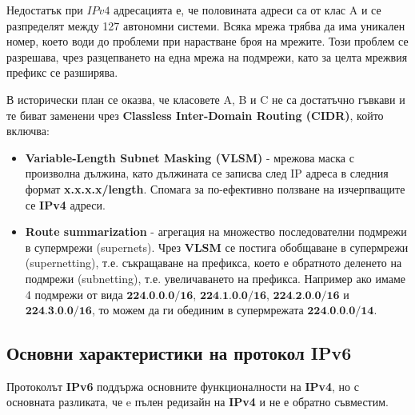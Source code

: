 \documentclass[fleqn,12pt]{article}
\begin{document}
\begin{flushleft}
Недостатък при $IPv4$ адресацията е, че половината адреси са от клас A и се разпределят между 127 автономни системи.
Всяка мрежа трябва да има уникален номер, което води до проблеми при нарастване броя на мрежите.
Този проблем се разрешава, чрез разцепването на една мрежа на подмрежи, като за целта мрежвия префикс се разширява.

В исторически план се оказва, че класовете A, B и C не са достатъчно гъвкави и те биват заменени чрез \textbf{Classless Inter-Domain Routing (CIDR)}, който включва:
\begin{itemize}
    \item \textbf{Variable-Length Subnet Masking (VLSM)} - мрежова маска с произволна дължина, като дължината се записва след IP адреса в следния формат \textbf{x.x.x.x/length}.
    Спомага за по-ефективно ползване на изчерпващите се \textbf{IPv4} адреси.
    \item \textbf{Route summarization} - агрегация на множество последователни подмрежи в супермрежи (supernets).
    Чрез \textbf{VLSM} се постига обобщаване в супермрежи (supernetting), т.е. съкращаване на префикса, което е обратното деленето на подмрежи (subnetting), т.е. увеличаването на префикса.
    Например ако имаме 4 подмрежи от вида $\textbf{224.0.0.0/16}$, $\textbf{224.1.0.0/16}$, $\textbf{224.2.0.0/16}$ и $\textbf{224.3.0.0/16}$, то можем да ги обединим в супермрежата $\textbf{224.0.0.0/14}$.
\end{itemize}

\subsection{Основни характеристики на протокол IPv6}

Протоколът \textbf{IPv6} поддържа основните функционалности на \textbf{IPv4}, но с основната разликата, че e пълен редизайн на \textbf{IPv4} и не е обратно съвместим.


\end{flushleft}
\end{document}
